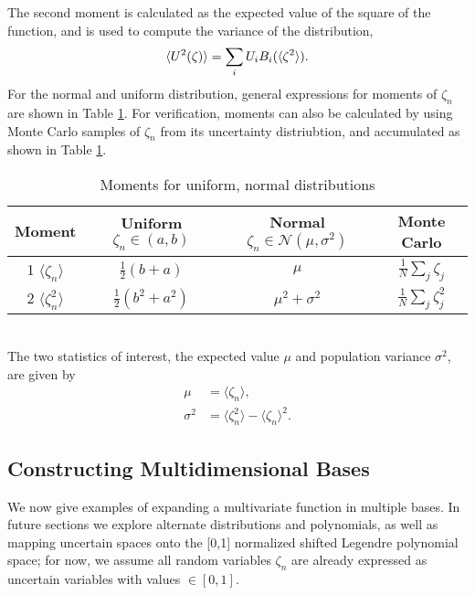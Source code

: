 The second moment is calculated as the expected value of the square of the function, and is used to compute the variance of the distribution,
\begin{align}
\langle U^2(\zeta) \rangle=\sum_i U_i B_i(\langle \zeta^2\rangle).
\end{align}
For the normal and uniform distribution, general expressions for moments of $\zeta_n$ are shown in Table \ref{tab:moments}.  For verification, moments can also be calculated by using Monte Carlo samples of $\zeta_n$ from its uncertainty distriubtion, and accumulated as shown in Table \ref{tab:moments}.
\begin{table}[h!]
\centering
\begin{tabular}{c | c | c || c}
Moment & Uniform $\zeta_n\in(a,b)$ & Normal $\zeta_n\in\mathcal{N}(\mu,\sigma^2)$ & Monte Carlo\\[3pt] \hline
1 $\langle\zeta_n\rangle$ & $\frac{1}{2}(b+a)$ & $\mu$ & $\frac{1}{N}\sum_j \zeta_{j}$\\[5pt]
2 $\langle\zeta_n^2\rangle$& $\frac{1}{2}(b^2+a^2)$ & $\mu^2+\sigma^2$ & $\frac{1}{N}\sum_j \zeta^2_{j}$
\end{tabular}
\caption{Moments for uniform, normal distributions}
\label{tab:moments}
\end{table}\\
The two statistics of interest, the expected value $\mu$ and population variance $\sigma^2$, are given by
\begin{align}
\mu &= \langle \zeta_n \rangle,\\
\sigma^2&=\langle \zeta^2_n \rangle - \langle \zeta_n\rangle^2.
\end{align}

\subsection{Constructing Multidimensional Bases}
We now give examples of expanding a multivariate function in multiple bases.  In future sections we explore alternate distributions and polynomials, as well as mapping uncertain spaces onto the [0,1] normalized shifted Legendre polynomial space; for now, we assume all random variables $\zeta_n$ are already expressed as uncertain variables with values $\in[0,1]$.

